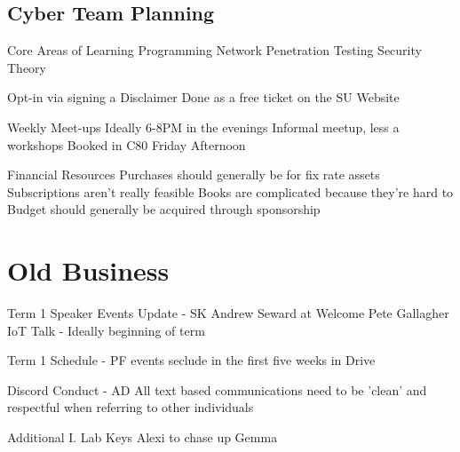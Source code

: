 \documentclass[11pt,hacksoc]{meetingmins}
\begin{document}
\subsection{Cyber Team Planning}
\begin{hiddensubitems}
	\item Core Areas of Learning
		\subitem Programming
		\subitem Network
		\subitem Penetration Testing
		\subitem Security Theory
	\item Opt-in via signing a Disclaimer
		\subitem Done as a free ticket on the SU Website
	\item Weekly Meet-ups
		\subitem Ideally 6-8PM in the evenings
		\subitem Informal meetup, less a workshops
		\subitem Booked in C80
		\subitem Friday Afternoon
	\item Financial Resources
		\subitem Purchases should generally be for fix rate assets
		\subitem Subscriptions aren't really feasible
		\subitem Books are complicated because they're hard to
		\subitem Budget should generally be acquired through sponsorship
\end{hiddensubitems}

\section{Old Business}
\begin{items}
	\item Term 1 Speaker Events Update - SK
		\subitem Andrew Seward at Welcome
		\subitem Pete Gallagher IoT Talk - Ideally beginning of term
	\item Term 1 Schedule - PF
		 events seclude in the first five weeks in Drive
	\item Discord Conduct - AD
		\subitem All text based communications need to be 'clean' and respectful when referring to other individuals
	\item Additional I. Lab Keys
		\subitem Alexi to chase up Gemma
\end{items}
\end{document}
